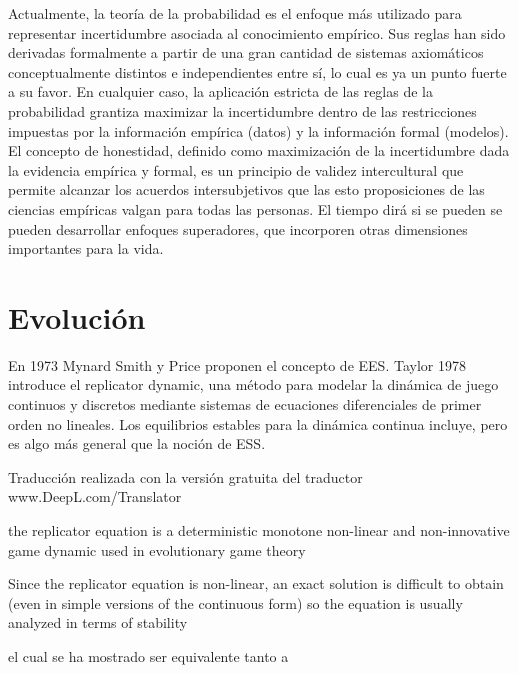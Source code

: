 \documentclass[a4paper,10pt]{article}
\begin{document}
Actualmente, la teoría de la probabilidad es el enfoque más utilizado para representar incertidumbre asociada al conocimiento empírico.
Sus reglas han sido derivadas formalmente a partir de una gran cantidad de sistemas axiomáticos conceptualmente distintos e independientes entre sí, lo cual es ya un punto fuerte a su favor.
En cualquier caso, la aplicación estricta de las reglas de la probabilidad grantiza maximizar la incertidumbre dentro de las restricciones impuestas por la información empírica (datos) y la información formal (modelos).
El concepto de honestidad, definido como maximización de la incertidumbre dada la evidencia empírica y formal, es un principio de validez intercultural que permite alcanzar los acuerdos intersubjetivos que las esto proposiciones de las ciencias empíricas valgan para todas las personas.
El tiempo dirá si se pueden se pueden desarrollar enfoques superadores, que incorporen otras dimensiones importantes para la vida.

\section{Evolución}

En 1973 Mynard Smith y Price proponen el concepto de EES.
Taylor 1978 introduce el replicator dynamic, una método para modelar la dinámica de juego continuos y discretos mediante sistemas de ecuaciones diferenciales de primer orden no lineales.
Los equilibrios estables para la dinámica continua incluye, pero es algo más general que la noción de ESS.

Traducción realizada con la versión gratuita del traductor www.DeepL.com/Translator





the replicator equation is a deterministic monotone non-linear and non-innovative game dynamic used in evolutionary game theory




Since the replicator equation is non-linear, an exact solution is difficult to obtain (even in simple versions of the continuous form) so the equation is usually analyzed in terms of stability



el cual se ha mostrado ser equivalente tanto a 
\end{document}
